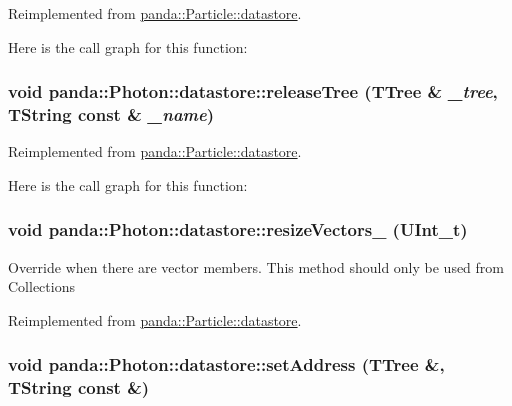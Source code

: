 Reimplemented from \hyperlink{structpanda_1_1Particle_1_1datastore_a09e5a80068f06d0d2118c2596258b8e3}{panda::Particle::datastore}.

Here is the call graph for this function:\hypertarget{structpanda_1_1Photon_1_1datastore_a05f8dcdf1df8a1e105ca3167c2ab94e2}{
\subsubsection[{releaseTree}]{\setlength{\rightskip}{0pt plus 5cm}void panda::Photon::datastore::releaseTree (TTree \& {\em \_\-tree}, \/  TString const \& {\em \_\-name})}}
\label{structpanda_1_1Photon_1_1datastore_a05f8dcdf1df8a1e105ca3167c2ab94e2}


Reimplemented from \hyperlink{structpanda_1_1Particle_1_1datastore_a9fa2653f0e8b59a5cbc752beaf6b7a57}{panda::Particle::datastore}.

Here is the call graph for this function:\hypertarget{structpanda_1_1Photon_1_1datastore_a819de9f7590bca725315d2b6432b0f6a}{
\subsubsection[{resizeVectors\_\-}]{\setlength{\rightskip}{0pt plus 5cm}void panda::Photon::datastore::resizeVectors\_\- (UInt\_\-t)}}
\label{structpanda_1_1Photon_1_1datastore_a819de9f7590bca725315d2b6432b0f6a}


Override when there are vector members. This method should only be used from Collections 

Reimplemented from \hyperlink{structpanda_1_1Particle_1_1datastore_aef7e06dbd8399f7de3215aa895907c5f}{panda::Particle::datastore}.\hypertarget{structpanda_1_1Photon_1_1datastore_a42cc43286a630dcffc73652309aa8990}{
\subsubsection[{setAddress}]{\setlength{\rightskip}{0pt plus 5cm}void panda::Photon::datastore::setAddress (TTree \&, \/  TString const \&)}}
\label{structpanda_1_1Photon_1_1datastore_a42cc43286a630dcffc73652309aa8990}


